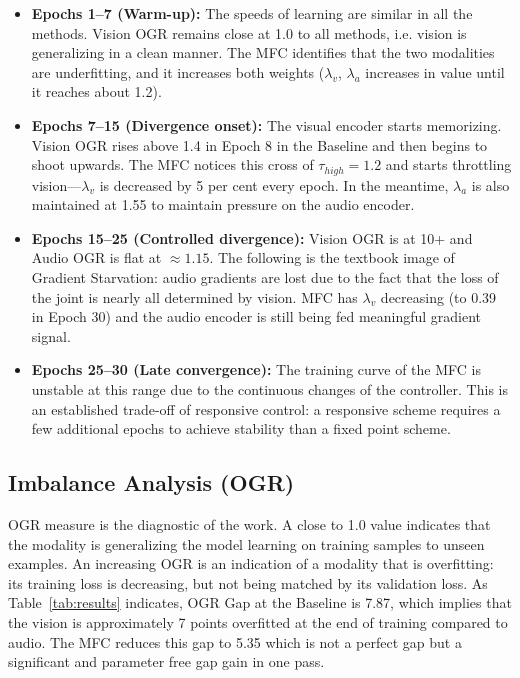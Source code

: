 \documentclass[10pt, twocolumn, letterpaper]{article}
\begin{document}
\begin{itemize}
    \item \textbf{Epochs 1--7 (Warm-up):} The speeds of learning are similar in all the methods. Vision OGR remains close at 1.0 to all methods, i.e. vision is generalizing in a clean manner. The MFC identifies that the two modalities are underfitting, and it increases both weights ($\lambda_v$, $\lambda_a$ increases in value until it reaches about 1.2).

    \item \textbf{Epochs 7--15 (Divergence onset):} The visual encoder starts memorizing. Vision OGR rises above 1.4 in Epoch 8 in the Baseline and then begins to shoot upwards. The MFC notices this cross of $\tau_{high} = 1.2$ and starts throttling vision---$\lambda_v$ is decreased by 5 per cent every epoch. In the meantime, $\lambda_a$ is also maintained at 1.55 to maintain pressure on the audio encoder.

    \item \textbf{Epochs 15--25 (Controlled divergence):} Vision OGR is at 10+ and Audio OGR is flat at $\approx 1.15$. The following is the textbook image of Gradient Starvation: audio gradients are lost due to the fact that the loss of the joint is nearly all determined by vision. MFC has $\lambda_v$ decreasing (to 0.39 in Epoch 30) and the audio encoder is still being fed meaningful gradient signal.

    \item \textbf{Epochs 25--30 (Late convergence):} The training curve of the MFC is unstable at this range due to the continuous changes of the controller. This is an established trade-off of responsive control: a responsive scheme requires a few additional epochs to achieve stability than a fixed point scheme.
\end{itemize}

\subsection{Imbalance Analysis (OGR)}

OGR measure is the diagnostic of the work. A close to 1.0 value indicates that the modality is generalizing the model learning on training samples to unseen examples. An increasing OGR is an indication of a modality that is overfitting: its training loss is decreasing, but not being matched by its validation loss. As Table~\ref{tab:results} indicates, OGR Gap at the Baseline is 7.87, which implies that the vision is approximately 7 points overfitted at the end of training compared to audio. The MFC reduces this gap to 5.35 which is not a perfect gap but a significant and parameter free gap gain in one pass.
\end{document}
